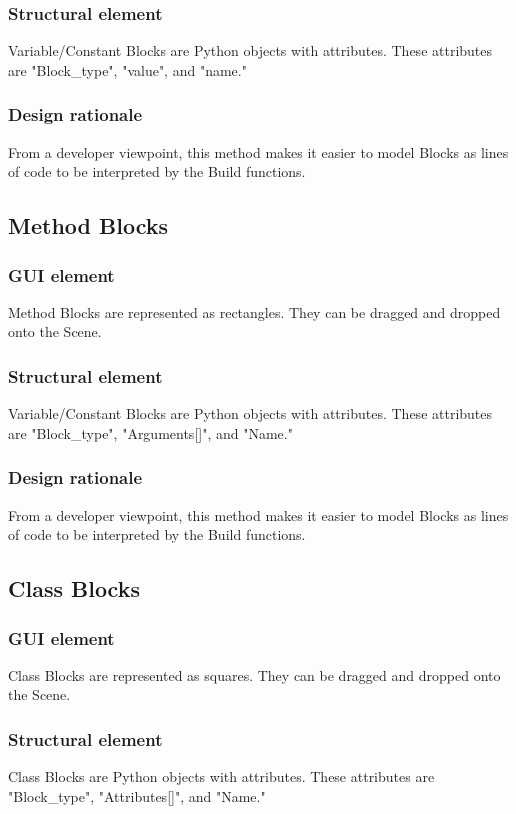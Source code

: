 \documentclass[journal,10pt,onecolumn,compsoc]{IEEEtran} \usepackage[margin=1.0in]{geometry} \usepackage{pdfpages}
\begin{document}
\subsubsection{Structural element}
\noindent Variable/Constant Blocks are Python objects with attributes.\cite{pythonvar}\cite{pythonclass}
These attributes are "Block\_type", "value", and "name."
\subsubsection{Design rationale}
\noindent From a developer viewpoint, this method makes it easier to model Blocks as lines of code to be interpreted by the Build functions.
\subsection{Method Blocks}
\subsubsection{GUI element}
\noindent Method Blocks are represented as rectangles.
They can be dragged and dropped onto the Scene.
\subsubsection{Structural element}
\noindent Variable/Constant Blocks are Python objects with attributes.\cite{pythonfunction}\cite{pythonclass}
These attributes are "Block\_type", "Arguments[]", and "Name."
\subsubsection{Design rationale}
\noindent From a developer viewpoint, this method makes it easier to model Blocks as lines of code to be interpreted by the Build functions.
\subsection{Class Blocks} 
\subsubsection{GUI element}
\noindent Class Blocks are represented as squares.
They can be dragged and dropped onto the Scene.
\subsubsection{Structural element}
\noindent Class Blocks are Python objects with attributes.\cite{pythonclass}
These attributes are "Block\_type", "Attributes[]", and "Name."
\end{document}
